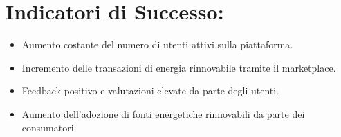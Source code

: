\documentclass{report}
\begin{document}
\section*{Indicatori di Successo:}
\begin{itemize}
    \item Aumento costante del numero di utenti attivi sulla piattaforma.
    \item Incremento delle transazioni di energia rinnovabile tramite il marketplace.
    \item Feedback positivo e valutazioni elevate da parte degli utenti.
    \item Aumento dell'adozione di fonti energetiche rinnovabili da parte dei consumatori.
\end{itemize}
\end{document}
